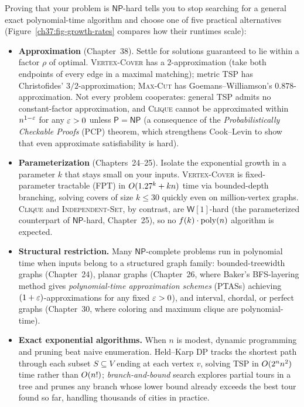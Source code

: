 Proving that your problem is $\mathsf{NP}$-hard tells you to stop searching for a general exact polynomial-time
algorithm and choose one of five practical alternatives (Figure~\ref{ch37:fig-growth-rates} compares how their runtimes scale):

\begin{itemize}
  \item \textbf{Approximation} (Chapter~38). Settle for solutions guaranteed to lie within a factor $\rho$ of optimal.
        \textsc{Vertex-Cover} has a $2$-approximation (take both endpoints of every edge in a maximal
        matching); metric \textsc{TSP} has Christofides' $3/2$-approximation; \textsc{Max-Cut} has
        Goemans--Williamson's $0.878$-approximation. Not every problem cooperates: general \textsc{TSP} admits no constant-factor approximation, and
        \textsc{Clique} cannot be approximated within $n^{1-\varepsilon}$ for any $\varepsilon>0$ unless
        $\mathsf{P}=\mathsf{NP}$ (a consequence of the \emph{Probabilistically Checkable Proofs} (PCP) theorem, which strengthens Cook--Levin to show that even approximate satisfiability is hard).
  \item \textbf{Parameterization} (Chapters~24--25). Isolate the exponential growth in a parameter $k$ that stays small on your inputs. \textsc{Vertex-Cover}
        is fixed-parameter tractable (FPT) in $O(1.27^k + kn)$ time via bounded-depth branching, solving covers of size $k\le 30$ quickly even on million-vertex graphs. \textsc{Clique} and
        \textsc{Independent-Set}, by contrast, are $\mathsf{W}[1]$-hard (the parameterized counterpart of $\mathsf{NP}$-hard, Chapter~25), so no $f(k)\cdot\operatorname{poly}(n)$ algorithm is expected.
  \item \textbf{Structural restriction.} Many $\mathsf{NP}$-complete problems run in polynomial time when inputs belong to a structured graph family: bounded-treewidth graphs (Chapter~24), planar graphs
        (Chapter~26, where Baker's BFS-layering method gives \emph{polynomial-time approximation schemes} (PTASs) achieving $(1+\varepsilon)$-approximations for any fixed $\varepsilon>0$), and interval, chordal, or perfect
        graphs (Chapter~30, where coloring and maximum clique are polynomial-time).
  \item \textbf{Exact exponential algorithms.} When $n$ is modest, dynamic programming and pruning beat naive enumeration. Held--Karp DP tracks the shortest path through each subset $S\subseteq V$ ending at each vertex $v$, solving \textsc{TSP} in $O(2^n n^2)$ time rather than $O(n!)$; \emph{branch-and-bound} search explores partial tours in a tree and prunes any branch whose lower bound already exceeds the best tour found so far, handling thousands of cities in practice.

\end{itemize}
